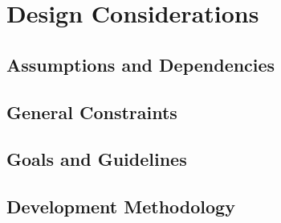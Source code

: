 \section{Design Considerations}
\label{sec:design}

\subsection{Assumptions and Dependencies}
\label{sec:assumptions}

\subsection{General Constraints}
\label{sec:constraints}

\subsection{Goals and Guidelines}
\label{sec:goals}

\subsection{Development Methodology}
\label{sec:methodology}


